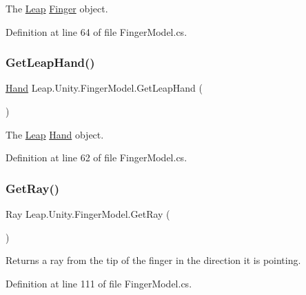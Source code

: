 The \mbox{\hyperlink{namespace_leap_1_1_unity_1_1_leap}{Leap}} \mbox{\hyperlink{class_leap_1_1_finger}{Finger}} object. 

Definition at line 64 of file Finger\+Model.\+cs.

\mbox{\label{class_leap_1_1_unity_1_1_finger_model_a4247dfc727b2b1d05c16a81c440ed22d}} 
\subsubsection{\texorpdfstring{GetLeapHand()}{GetLeapHand()}}
{\footnotesize\ttfamily \mbox{\hyperlink{class_leap_1_1_hand}{Hand}} Leap.\+Unity.\+Finger\+Model.\+Get\+Leap\+Hand (\begin{DoxyParamCaption}{ }\end{DoxyParamCaption})}

The \mbox{\hyperlink{namespace_leap_1_1_unity_1_1_leap}{Leap}} \mbox{\hyperlink{class_leap_1_1_hand}{Hand}} object. 

Definition at line 62 of file Finger\+Model.\+cs.

\mbox{\label{class_leap_1_1_unity_1_1_finger_model_a88e07c014c2ac4cfa7403760bc1d2dd7}} 
\subsubsection{\texorpdfstring{GetRay()}{GetRay()}}
{\footnotesize\ttfamily Ray Leap.\+Unity.\+Finger\+Model.\+Get\+Ray (\begin{DoxyParamCaption}{ }\end{DoxyParamCaption})}

Returns a ray from the tip of the finger in the direction it is pointing. 

Definition at line 111 of file Finger\+Model.\+cs.

\mbox{\label{class_leap_1_1_unity_1_1_finger_model_a16b8b56d0d1d8f2876fede7df4914143}} 
